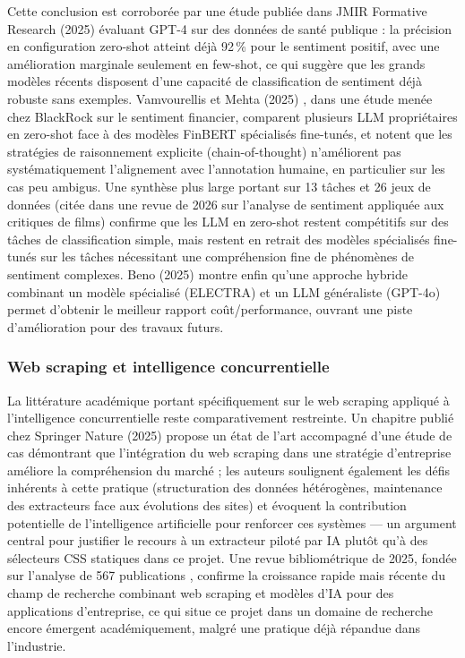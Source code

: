 Cette conclusion est corroborée par une étude publiée dans JMIR Formative Research (2025) évaluant GPT-4 sur
des données de santé publique : la précision en configuration zero-shot atteint déjà 92\,\% pour le sentiment
positif, avec une amélioration marginale seulement en few-shot, ce qui suggère que les grands modèles
récents disposent d'une capacité de classification de sentiment déjà robuste sans exemples. Vamvourellis et
Mehta (2025) \cite{vamvourellis2025}, dans une étude menée chez BlackRock sur le sentiment financier,
comparent plusieurs LLM propriétaires en zero-shot face à des modèles FinBERT spécialisés fine-tunés, et
notent que les stratégies de raisonnement explicite (chain-of-thought) n'améliorent pas systématiquement
l'alignement avec l'annotation humaine, en particulier sur les cas peu ambigus. Une synthèse plus large
portant sur 13 tâches et 26 jeux de données (citée dans une revue de 2026 sur l'analyse de sentiment
appliquée aux critiques de films) confirme que les LLM en zero-shot restent compétitifs sur des tâches de
classification simple, mais restent en retrait des modèles spécialisés fine-tunés sur les tâches nécessitant
une compréhension fine de phénomènes de sentiment complexes. Beno (2025) \cite{beno2025} montre enfin qu'une
approche hybride combinant un modèle spécialisé (ELECTRA) et un LLM généraliste (GPT-4o) permet d'obtenir le
meilleur rapport coût/performance, ouvrant une piste d'amélioration pour des travaux futurs.

\subsubsection{Web scraping et intelligence concurrentielle}

La littérature académique portant spécifiquement sur le web scraping appliqué à l'intelligence
concurrentielle reste comparativement restreinte. Un chapitre publié chez Springer Nature (2025)
\cite{springer2025} propose un état de l'art accompagné d'une étude de cas démontrant que l'intégration du
web scraping dans une stratégie d'entreprise améliore la compréhension du marché ; les auteurs soulignent
également les défis inhérents à cette pratique (structuration des données hétérogènes, maintenance des
extracteurs face aux évolutions des sites) et évoquent la contribution potentielle de l'intelligence
artificielle pour renforcer ces systèmes --- un argument central pour justifier le recours à un extracteur
piloté par IA plutôt qu'à des sélecteurs CSS statiques dans ce projet. Une revue bibliométrique de 2025,
fondée sur l'analyse de 567 publications \cite{bibliometrique2025}, confirme la croissance rapide mais
récente du champ de recherche combinant web scraping et modèles d'IA pour des applications d'entreprise, ce
qui situe ce projet dans un domaine de recherche encore émergent académiquement, malgré une pratique déjà
répandue dans l'industrie.

